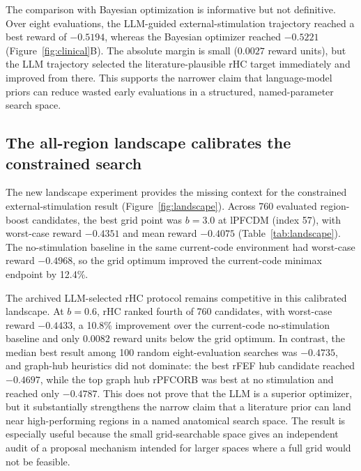 \documentclass{article}
\begin{document}
The comparison with Bayesian optimization is informative but not definitive. Over eight evaluations, the LLM-guided external-stimulation trajectory reached a best reward of $-0.5194$, whereas the Bayesian optimizer reached $-0.5221$ (Figure~\ref{fig:clinical}B). The absolute margin is small ($0.0027$ reward units), but the LLM trajectory selected the literature-plausible rHC target immediately and improved from there. This supports the narrower claim that language-model priors can reduce wasted early evaluations in a structured, named-parameter search space.

\subsection{The all-region landscape calibrates the constrained search}
The new landscape experiment provides the missing context for the constrained external-stimulation result (Figure~\ref{fig:landscape}). Across 760 evaluated region-boost candidates, the best grid point was $b=3.0$ at lPFCDM (index 57), with worst-case reward $-0.4351$ and mean reward $-0.4075$ (Table~\ref{tab:landscape}). The no-stimulation baseline in the same current-code environment had worst-case reward $-0.4968$, so the grid optimum improved the current-code minimax endpoint by 12.4\%.

The archived LLM-selected rHC protocol remains competitive in this calibrated landscape. At $b=0.6$, rHC ranked fourth of 760 candidates, with worst-case reward $-0.4433$, a 10.8\% improvement over the current-code no-stimulation baseline and only $0.0082$ reward units below the grid optimum. In contrast, the median best result among 100 random eight-evaluation searches was $-0.4735$, and graph-hub heuristics did not dominate: the best rFEF hub candidate reached $-0.4697$, while the top graph hub rPFCORB was best at no stimulation and reached only $-0.4787$. This does not prove that the LLM is a superior optimizer, but it substantially strengthens the narrow claim that a literature prior can land near high-performing regions in a named anatomical search space. The result is especially useful because the small grid-searchable space gives an independent audit of a proposal mechanism intended for larger spaces where a full grid would not be feasible.
\end{document}
